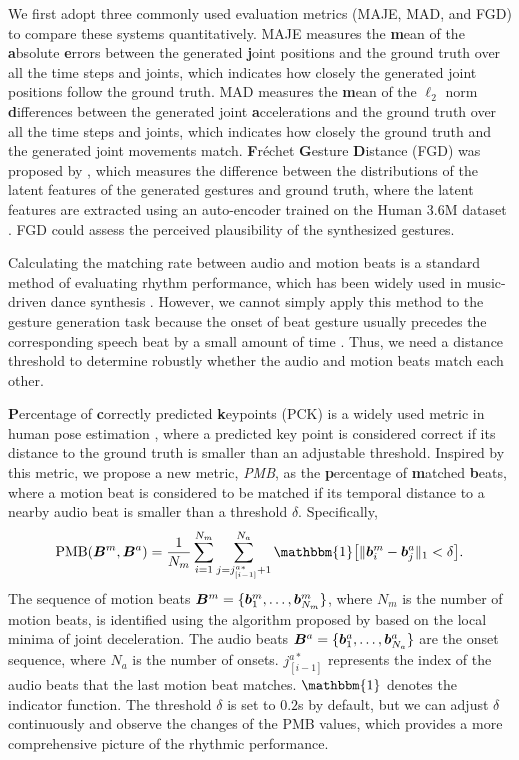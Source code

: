 We first adopt three commonly used evaluation metrics (MAJE, MAD, and FGD) to compare these systems quantitatively. 
MAJE measures the \textbf{m}ean of the \textbf{a}bsolute \textbf{e}rrors between the generated \textbf{j}oint positions and the ground truth over all the time steps and joints, which indicates how closely the generated joint positions follow the ground truth. 
MAD measures the \textbf{m}ean of the $\ell_2$ norm \textbf{d}ifferences between the generated joint \textbf{a}ccelerations and the ground truth over all the time steps and joints, which indicates how closely the ground truth and the generated joint movements match.
\textbf{F}r{\'e}chet \textbf{G}esture \textbf{D}istance (FGD) was proposed by \citet{yoon2020speech}, which measures the difference between the distributions of the latent features of the generated gestures and ground truth, where the latent features are extracted using an auto-encoder trained on the Human 3.6M dataset \cite{ionescu2013human3}. FGD could assess the perceived plausibility of the synthesized gestures.  

Calculating the matching rate between audio and motion beats is a standard method of evaluating rhythm performance, which has been widely used in music-driven dance synthesis \cite{Li_2021_aist, chen2021choreomaster}. However, we cannot simply apply this method to the gesture generation task because the onset of beat gesture usually precedes the corresponding speech beat by a small amount of time \cite{pouw2019quantifying}. Thus, we need a distance threshold to determine robustly whether the audio and motion beats match each other. 

\textbf{P}ercentage of \textbf{c}orrectly predicted \textbf{k}eypoints (PCK)  is a widely used metric in human pose estimation \cite{Wei_2016_openpose, mehta2017vnect}, where a predicted key point is considered correct if its distance to the ground truth is smaller than an adjustable threshold. Inspired by this metric, we propose a new metric, \emph{PMB}, as the \textbf{p}ercentage of \textbf{m}atched \textbf{b}eats, where a motion beat is considered to be matched if its temporal distance to a nearby audio beat is smaller than a threshold $\delta$. Specifically,
\begin{equation}
    \eqword{PMB}(\vect{B}^{{m}}, \vect{B}^{{a}}) = \frac{1}{N_m}\sum^{N_m}_{i=1}\sum^{N_a}_{j=j_{[i-1]}^{{a}*}+1} \mathbbm{1}\big[\lVert \vect{b}_i^{{m}} - \vect{b}_j^{{a}} \rVert_1 < \delta\big].
\end{equation}
The sequence of motion beats $\bm{B}^{{m}}=\{\bm{b}_1^{{m}}, \dots, \bm{b}_{N_m}^{{m}}\}$, where $N_m$ is the number of motion beats, is identified using the algorithm proposed by \citet{ho2013motionbeat} based on the local minima of joint deceleration. 
The audio beats $\bm{B}^{{a}}=\{\bm{b}_1^{{a}}, \dots, \bm{b}_{N_a}^{{a}}\}$ are the onset sequence, where $N_a$ is the number of onsets. $j_{[i-1]}^{{a}*}$ represents the index of the audio beats that the last motion beat matches. $\mathbbm{1}$ denotes the indicator function. The threshold $\delta$ is set to $0.2$s by default, but we can adjust $\delta$ continuously and observe the changes of the PMB values, which provides a more comprehensive picture of the rhythmic performance.

